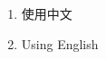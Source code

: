 \documentclass[nofonts]{ctexart}
\begin{document}
\begin{enumerate}
	\item 使用中文
	\item Using English
\end{enumerate}
\end{document}

